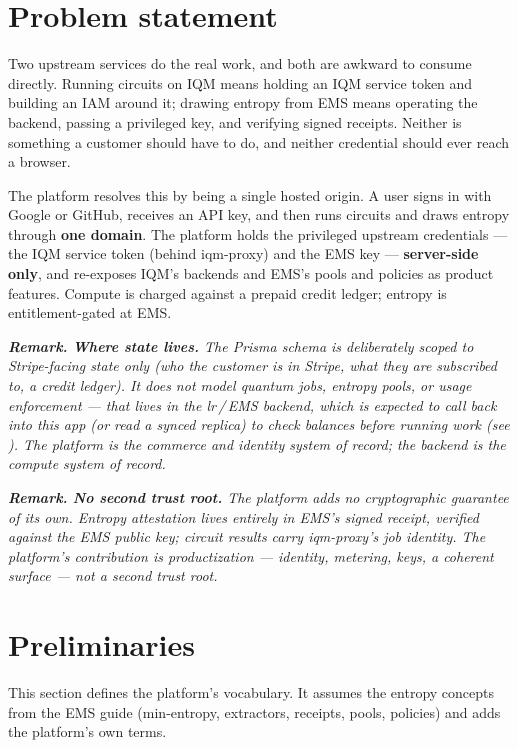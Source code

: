 \documentclass[11pt]{article}
\newenvironment{remark}
  {\par\medskip\noindent\small\itshape\textbf{\upshape Remark.}\hspace{0.4em}\ignorespaces}
  {\par\medskip}
\begin{document}
\section{Problem statement}
Two upstream services do the real work, and both are awkward to consume directly. Running circuits on IQM means holding
an IQM service token and building an IAM around it; drawing entropy from EMS means operating the backend, passing a
privileged key, and verifying signed receipts. Neither is something a customer should have to do, and neither credential
should ever reach a browser.

The platform resolves this by being a single hosted origin. A user signs in with Google or GitHub, receives an API key,
and then runs circuits and draws entropy through \textbf{one domain}. The platform holds the privileged upstream
credentials --- the IQM service token (behind iqm-proxy) and the EMS key --- \textbf{server-side only}, and re-exposes
IQM's backends and EMS's pools and policies as product features. Compute is charged against a prepaid credit ledger;
entropy is entitlement-gated at EMS.

\begin{remark}
\textbf{\upshape Where state lives.} The Prisma schema is deliberately scoped to \emph{Stripe-facing} state only (who the
customer is in Stripe, what they are subscribed to, a credit ledger). It does not model quantum jobs, entropy pools, or
usage enforcement --- that lives in the lr\,/\,EMS backend, which is expected to call back into this app (or read a
synced replica) to check balances before running work (see ). The platform is the commerce
and identity system of record; the backend is the compute system of record.
\end{remark}

\begin{remark}
\textbf{\upshape No second trust root.} The platform adds no cryptographic guarantee of its own. Entropy attestation
lives entirely in EMS's signed receipt, verified against the EMS public key; circuit results carry iqm-proxy's job
identity. The platform's contribution is productization --- identity, metering, keys, a coherent surface --- not a
second trust root.
\end{remark}

\section{Preliminaries}
This section defines the platform's vocabulary. It assumes the entropy concepts from the EMS guide (min-entropy,
extractors, receipts, pools, policies) and adds the platform's own terms.
\end{document}
